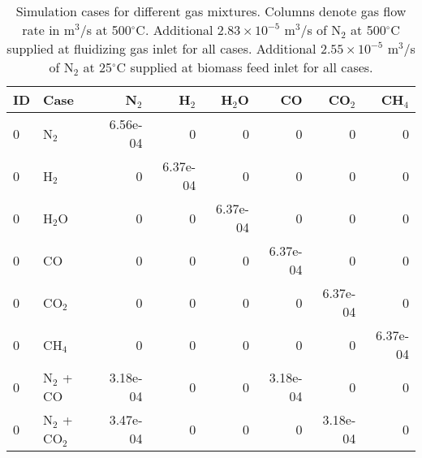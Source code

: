 \begin{table}
    \centering
    \caption{Simulation cases for different gas mixtures. Columns denote gas flow rate in m$^3$/s at 500$^\circ$C. Additional $2.83\times10^{-5}$ m$^3$/s of N$_2$ at 500$^\circ$C supplied at fluidizing gas inlet for all cases. Additional $2.55\times10^{-5}$ m$^3$/s of N$_2$ at 25$^\circ$C supplied at biomass feed inlet for all cases.}
    \begin{tabular}{llrrrrrr}
        \toprule
        ID & Case          & N$_2$    & H$_2$    & H$_2$O   & CO       & CO$_2$   & CH$_4$ \\
        \midrule
        0 & N$_2$          & 6.56e-04 & 0        & 0        & 0        & 0        & 0        \\
        0 & H$_2$          & 0        & 6.37e-04 & 0        & 0        & 0        & 0        \\
        0 & H$_2$O         & 0        & 0        & 6.37e-04 & 0        & 0        & 0        \\
        0 & CO             & 0        & 0        & 0        & 6.37e-04 & 0        & 0        \\
        0 & CO$_2$         & 0        & 0        & 0        & 0        & 6.37e-04 & 0        \\
        0 & CH$_4$         & 0        & 0        & 0        & 0        & 0        & 6.37e-04 \\
        0 & N$_2$ + CO     & 3.18e-04 & 0        & 0        & 3.18e-04 & 0        & 0        \\
        0 & N$_2$ + CO$_2$ & 3.47e-04 & 0        & 0        & 0        & 3.18e-04 & 0        \\
        \bottomrule
    \end{tabular}
\end{table}
